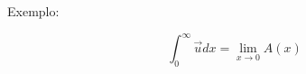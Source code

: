 \documentclass[a4paper,12pt]{extreport}
\begin{document}
Exemplo:

\begin{equation}
  \int_0^\infty \vec{u} dx = \lim_{x \to 0} A(x)
\end{equation}
\end{document}
